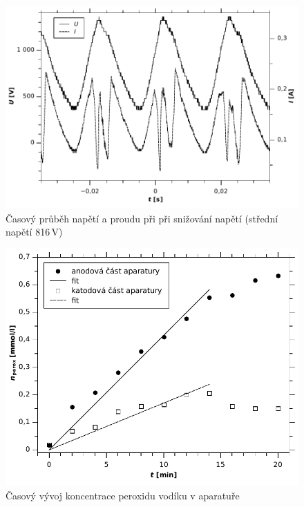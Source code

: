 \documentclass[12pt]{article}
\begin{document}
\begin{figure}[htbp]
\begin{center}
\includegraphics[width=12cm]{klesajicinapeti.pdf}
\caption{Časový průběh napětí a proudu při při snižování napětí (střední napětí 816\,V)}
\label{vyvoj3}
\end{center}
\end{figure}

\begin{figure}[htbp]
\begin{center}
\includegraphics[width=12cm]{Graph2.pdf}
\caption{Časový vývoj koncentrace peroxidu vodíku v aparatuře}
\label{koncentrace}
\end{center}
\end{figure}

\newpage
\end{document}
